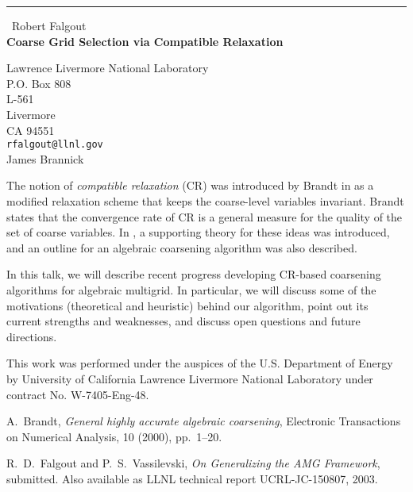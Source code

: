 \documentclass{report}
\begin{document}
\begin{center}
\rule{6in}{1pt} \
{\large Robert Falgout \\
{\bf Coarse Grid Selection via Compatible Relaxation}}

Lawrence Livermore National Laboratory \\ P.O. Box 808 \\ L-561 \\ Livermore \\ CA  94551
\\
{\tt rfalgout@llnl.gov}\\
James Brannick\end{center}

The notion of {\em compatible relaxation} (CR) was introduced by
Brandt in \cite{ABrandt_2000} as a modified relaxation scheme that
keeps the coarse-level variables invariant. Brandt states that the
convergence rate of CR is a general measure for the quality of the set
of coarse variables. In \cite{RDFalgout_PSVassilevski_2003}, a
supporting theory for these ideas was introduced, and an outline for
an algebraic coarsening algorithm was also described.

In this talk, we will describe recent progress developing CR-based
coarsening algorithms for algebraic multigrid. In particular, we will
discuss some of the motivations (theoretical and heuristic) behind our
algorithm, point out its current strengths and weaknesses, and discuss
open questions and future directions.

This work was performed under the auspices of the U.S. Department of
Energy by University of California Lawrence Livermore National
Laboratory under contract No. W-7405-Eng-48.

\begin{thebibliography}{1}

{\sc A.~Brandt}, {\em General highly accurate algebraic coarsening},
Electronic Transactions on Numerical Analysis, 10 (2000), pp.~1--20.

{\sc R.~D.~Falgout and P.~S.~Vassilevski}, {\em On Generalizing the
{AMG} Framework}, submitted. Also available as LLNL technical report
UCRL-JC-150807, 2003.

\end{thebibliography}
\end{document}
